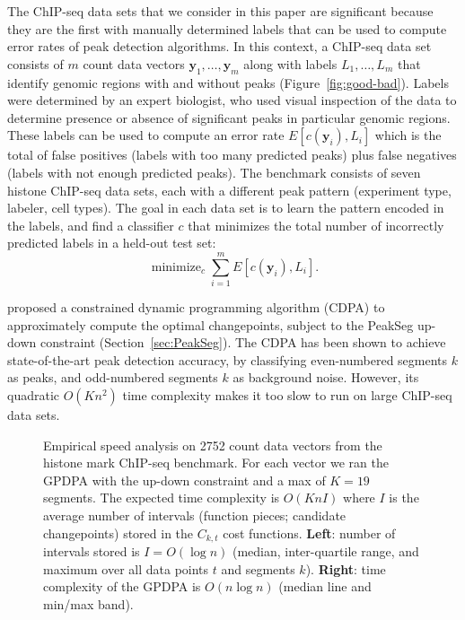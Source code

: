 \documentclass[aoas]{imsart}
\DeclareMathOperator*{\minimize}{minimize}
\begin{document}
The ChIP-seq data sets that we consider in this paper are significant
because they are the first with manually determined labels that can be
used to compute error rates of peak detection algorithms. In this
context, a ChIP-seq data set consists of $m$ count data vectors
$\mathbf y_1,\dots,\mathbf y_m$ along with labels $L_1,\dots, L_m$
that identify genomic regions with and without peaks
(Figure~\ref{fig:good-bad}). Labels were determined by an expert
biologist, who used visual inspection of the data to
determine presence or absence of significant peaks in particular
genomic regions. These labels can be used to compute an error rate
$E[c(\mathbf y_i), L_i]$ which is the total of false positives (labels with
too many predicted peaks) plus false negatives (labels with not enough
predicted peaks). The benchmark consists of seven histone ChIP-seq
data sets, each with a different peak pattern (experiment type,
labeler, cell types). The goal in each data set is to learn the
pattern encoded in the labels, and find a classifier $c$ that
minimizes the total number of incorrectly predicted labels in a
held-out test set:
\begin{equation}
  \label{eq:learn}
  \minimize_c
  \sum_{i=1}^m 
  E\left[
    c(\mathbf y_i), L_i
  \right].
\end{equation}

\citet{HOCKING-PeakSeg} proposed a constrained dynamic programming
algorithm (CDPA) to approximately compute the optimal changepoints,
subject to the PeakSeg up-down constraint
(Section~\ref{sec:PeakSeg}). The CDPA has been shown to achieve
state-of-the-art peak detection accuracy, by classifying even-numbered
segments $k$ as peaks, and odd-numbered segments $k$ as background
noise. However, its quadratic $O(Kn^2)$ time complexity makes it too
slow to run on large ChIP-seq data sets.

\begin{figure}[t!]
  \centering
  \parbox{0.49\textwidth}{
    
  }
  \parbox{0.49\textwidth}{
    
  }
  \vskip -0.5cm
  \caption{Empirical speed analysis on 2752 count data vectors from
    the histone mark ChIP-seq benchmark. For each vector we ran the
    GPDPA with the up-down constraint and a max of $K=19$
    segments. The expected time complexity is $O(KnI)$ where $I$ is
    the average number of intervals (function pieces; candidate
    changepoints) stored in the $C_{k,t}$ cost
    functions. \textbf{Left}: number of intervals stored is
    $I=O(\log n)$ (median, inter-quartile range, and maximum over all
    data points $t$ and segments $k$).  \textbf{Right}: time
    complexity of the GPDPA is $O(n\log n)$ (median line and min/max
    band).}
  \label{fig:timings}
\end{figure}
\end{document}
